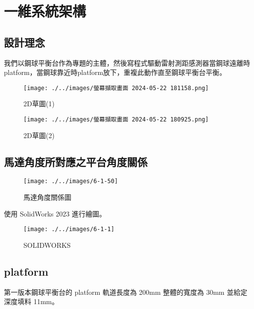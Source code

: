 \newpage
\section{一維系統架構}

\subsection{設計理念}

我們以鋼球平衡台作為專題的主體，然後寫程式驅動雷射測距感測器當鋼球遠離時platform，當鋼球靠近時platform放下，重複此動作直至鋼球平衡台平衡。

\begin{figure}[h!]
    \centering
    \begin{minipage}[b]{0.45\textwidth}
        \centering
        \texttt{[image: ./../images/螢幕擷取畫面 2024-05-22 181158.png]}
        \caption{2D草圖(1)}
    \end{minipage}
    \hfill
    \begin{minipage}[b]{0.45\textwidth}
        \centering
        \texttt{[image: ./../images/螢幕擷取畫面 2024-05-22 180925.png]} 
        \caption{2D草圖(2)}
    \end{minipage}
\end{figure}

\subsection{馬達角度所對應之平台角度關係}

\begin{figure}[htbp]
    \centering
    \texttt{[image: ./../images/6-1-50]}
    \caption{馬達角度關係圖}
\end{figure}

\newpage

使用 SolidWorks 2023 進行繪圖。
\begin{figure}[htbp]
    \centering
    \texttt{[image: ./../images/6-1-1]}
    \caption{SOLIDWORKS}
\end{figure}

\subsection{platform}

第一版本鋼球平衡台的 platform 軌道長度為 200mm 整體的寬度為 30mm 並給定深度填料 11mm。

